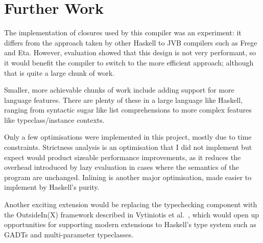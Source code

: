 \documentclass[dissertation.tex]{subfiles}
\begin{document}
\section{Further Work}
{
    The implementation of closures used by this compiler was an experiment: it differs from the approach taken by other Haskell to JVB compilers such as Frege and Eta. However, evaluation showed that this design is not very performant, so it would benefit the compiler to switch to the more efficient approach; although that is quite a large chunk of work.

    Smaller, more achievable chunks of work include adding support for more language features. There are plenty of these in a large language like Haskell, ranging from syntactic sugar like list comprehensions to more complex features like typeclass/instance contexts.

    Only a few optimisations were implemented in this project, mostly due to time constraints. Strictness analysis is an optimisation that I did not implement but expect would product sizeable performance improvements, as it reduces the overhead introduced by lazy evaluation in cases where the semantics of the program are unchanged. Inlining is another major optimisation, made easier to implement by Haskell's purity.

    Another exciting extension would be replacing the typechecking component with the OutsideIn(X) framework described in Vytiniotis et al.\ \cite{OutsideIn}, which would open up opportunities for supporting modern extensions to Haskell's type system such as GADTs and multi-parameter typeclasses. 
}
\end{document}
